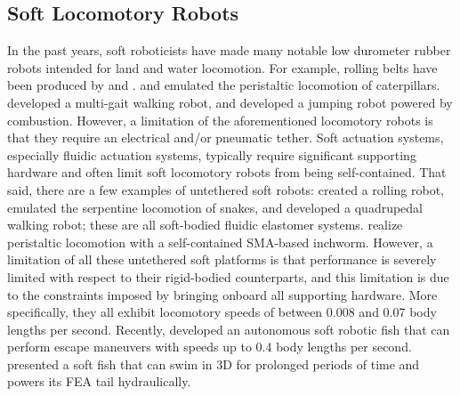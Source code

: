 \subsection{Soft Locomotory Robots}
\label{subsec:RW Land}
In the past years, soft roboticists have made many notable low durometer rubber robots intended for land and water locomotion.
For example, rolling belts have been produced by \citet{correll2010soft} and \citet{marchese2011soft}.
\citet{trimmer2006caterpillar} and \citet{umedachi2013highly} emulated the peristaltic locomotion of caterpillars. \citet{shepherd2011multigait} developed a multi-gait walking robot, and \citet{shepherd2013using} developed a jumping robot powered by combustion.
However, a limitation of the aforementioned locomotory robots is that they require an electrical and/or pneumatic tether.
Soft actuation systems, especially fluidic actuation systems, typically require significant supporting hardware and often limit soft locomotory robots from being self-contained.
That said, there are a few examples of untethered soft robots:
\citet{onal2011soft} created a rolling robot, \citet{onal2013autonomous} emulated the serpentine locomotion of snakes, and \cite{tolley2014resilient} developed a quadrupedal walking robot; these are all soft-bodied fluidic elastomer systems.
\citet{seok2010peristaltic} realize peristaltic locomotion with a self-contained SMA-based inchworm.
However, a limitation of all these untethered soft platforms is that performance is severely limited with respect to their rigid-bodied counterparts, and this limitation is due to the constraints imposed by bringing onboard all supporting hardware.
More specifically, they all exhibit locomotory speeds of between 0.008 and 0.07 body lengths per second.
Recently, \citet{marchese2014autonomous} developed an autonomous soft robotic fish that can perform escape maneuvers with speeds up to 0.4 body lengths per second. \citet{katzschmann2014hydraulic} presented a soft fish that can swim in 3D for prolonged periods of time and powers its FEA tail hydraulically.

